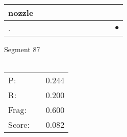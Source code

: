 \documentclass[landscape]{article}
\newcommand{\ssp}{\hspace{2pt}}
\newcommand{\mex}{\cellcolor{g}$\bullet$}
\begin{document}
\begin{tabular}{|l|p{10pt}|p{10pt}|p{10pt}|p{10pt}|p{10pt}|p{10pt}|p{10pt}|p{10pt}|p{10pt}|p{10pt}|}
\hline
\ssp nozzle \ssp&\hspace{2pt}&\hspace{2pt}&\hspace{2pt}&\hspace{2pt}&\hspace{2pt}&\hspace{2pt}&\hspace{2pt}&\hspace{2pt}&\hspace{2pt}&\hspace{2pt}\\
\hline
\ssp \cellcolor{ref9}. \ssp&\hspace{2pt}&\hspace{2pt}&\hspace{2pt}&\hspace{2pt}&\hspace{2pt}&\hspace{2pt}&\hspace{2pt}&\hspace{2pt}&\hspace{2pt}&\hspace{2pt}\mex\\
\hline
\end{tabular}

\vspace{6pt}
\noindent Segment 87\\\\
\noindent\begin{tabular}{lm{12pt}r}
\hline
P:&&0.244\\
R:&&0.200\\
Frag:&&0.600\\
Score:&&0.082\\
\end{tabular}

\newpage
\end{document}
